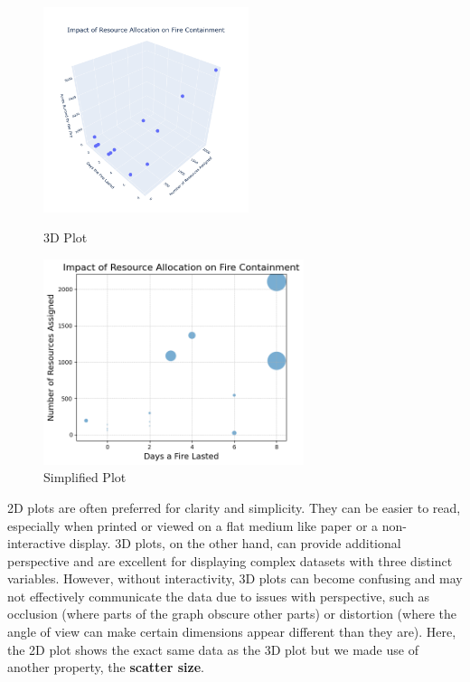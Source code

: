 \begin{figure}[h]
    \centering
    \begin{minipage}{.5\textwidth}
        \centering
        \includegraphics[height=6cm]{Images/figures/3d.png}
        \caption{3D Plot}
        \label{fig:plot1}
    \end{minipage}%
    \begin{minipage}{.5\textwidth}
        \centering
        \includegraphics[height=6cm]{Images/figures/scatter_sizes.png}
        \caption{Simplified Plot}
        \label{fig:plot2}
    \end{minipage}
\end{figure}

2D plots are often preferred for clarity and simplicity. They can be easier to read, especially when printed or viewed on a flat medium like paper or a non-interactive display. 3D plots, on the other hand, can provide additional perspective and are excellent for displaying complex datasets with three distinct variables. However, without interactivity, 3D plots can become confusing and may not effectively communicate the data due to issues with perspective, such as occlusion (where parts of the graph obscure other parts) or distortion (where the angle of view can make certain dimensions appear different than they are). Here, the 2D plot shows the exact same data as the 3D plot but we made use of another property, the \textbf{scatter size}.

